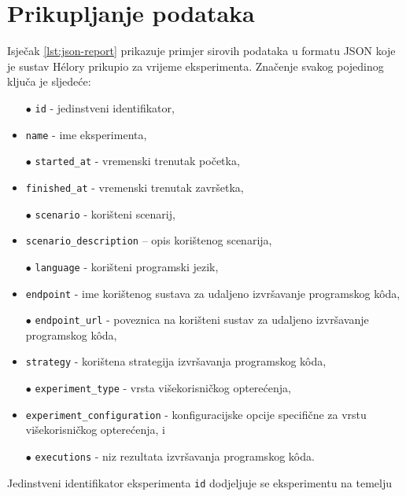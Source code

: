 \documentclass[times, utf8, diplomski]{fer}
\begin{document}
\section{Prikupljanje podataka}
Isječak \ref{lst:json-report} prikazuje primjer sirovih podataka u formatu JSON koje je sustav Hélory prikupio za vrijeme eksperimenta. Značenje svakog pojedinog ključa je sljedeće:
\begin{itemize}
    \item[$\bullet$] \lstinline{id} - jedinstveni identifikator,
    \item[$\bullet$] \lstinline{name} - ime eksperimenta,
    \item[$\bullet$] \lstinline{started_at} - vremenski trenutak početka,
    \item[$\bullet$] \lstinline{finished_at} - vremenski trenutak završetka,
    \item[$\bullet$] \lstinline{scenario} - korišteni scenarij,
    \item[$\bullet$] \lstinline{scenario_description} -- opis korištenog scenarija,
    \item[$\bullet$] \lstinline{language} - korišteni programski jezik,
    \item[$\bullet$] \lstinline{endpoint} - ime korištenog sustava za udaljeno izvršavanje programskog kôda,
    \item[$\bullet$] \lstinline{endpoint_url} - poveznica na korišteni sustav za udaljeno izvršavanje programskog kôda,
    \item[$\bullet$] \lstinline{strategy} - korištena strategija izvršavanja programskog kôda,
    \item[$\bullet$] \lstinline{experiment_type} - vrsta višekorisničkog opterećenja,
    \item[$\bullet$] \lstinline{experiment_configuration} - konfiguracijske opcije specifične za vrstu višekorisničkog opterećenja, i
    \item[$\bullet$] \lstinline{executions} - niz rezultata izvršavanja programskog kôda.
\end{itemize}

Jedinstveni identifikator eksperimenta \lstinline{id} dodjeljuje se eksperimentu na temelju 
\pagebreak
\end{document}
